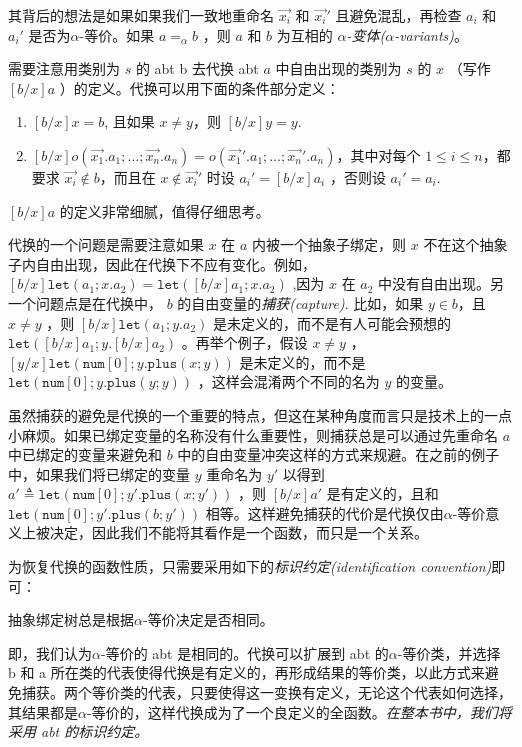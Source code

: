 其背后的想法是如果如果我们一致地重命名 \(\vec{x_i}\) 和 \(\vec{x_i}'\)
且避免混乱，再检查 \(a_i\) 和 \(a_i'\) 是否为$\alpha$-等价。如果
\(a=_\alpha b\) ，则 \(a\) 和 \(b\) 为互相的 \emph{$\alpha$-变体($\alpha$-variants)}。

需要注意用类别为 \(s\) 的 abt b 去代换 abt \(a\) 中自由出现的类别为
\(s\) 的 \(x\) （写作 \([b/x]a\)
）的定义。代换可以用下面的条件部分定义：

\begin{enumerate}
\def\labelenumi{\arabic{enumi}.}
\item
  \([b/x]x=b\), 且如果 \(x\neq y\)，则 \([b/x]y=y\).
\item
  \([b/x]o(\vec{x_1}.a_1;\dots;\vec{x_n}.a_n)=o(\vec{x_1}'.a_1;\dots;\vec{x_n}'.a_n)\)，其中对每个
  \(1\leq i\leq n\)，都要求 \(\vec{x_i}\notin b\)，而且在
  \(x\notin \vec{x_i}'\) 时设 \(a_i'=[b/x]a_i\) ，否则设 \(a_i'=a_i\).
\end{enumerate}

\([b/x]a\) 的定义非常细腻，值得仔细思考。

代换的一个问题是需要注意如果 \(x\) 在 \(a\) 内被一个抽象子绑定，则 \(x\)
不在这个抽象子内自由出现，因此在代换下不应有变化。例如，
\([b/x]\texttt{let}(a_1;x.a_2)=\texttt{let}([b/x]a_1;x.a_2)\) ,因为
\(x\) 在 \(a_2\) 中没有自由出现。另一个问题点是在代换中， \(b\)
的自由变量的\emph{捕获(capture)}. 比如，如果 \(y\in b\)，且 \(x\neq y\)
，则 \([b/x]\texttt{let}(a_1;y.a_2)\) 是未定义的，而不是有人可能会预想的
\(\texttt{let}([b/x]a_1;y.[b/x]a_2)\) 。再举个例子，假设 \(x\neq y\) ，
\([y/x]\texttt{let}(\texttt{num}[0];y.\texttt{plus}(x;y))\)
是未定义的，而不是
\(\texttt{let}(\texttt{num}[0];y.\texttt{plus}(y;y))\)
，这样会混淆两个不同的名为 \(y\) 的变量。

虽然捕获的避免是代换的一个重要的特点，但这在某种角度而言只是技术上的一点小麻烦。如果已绑定变量的名称没有什么重要性，则捕获总是可以通过先重命名
\(a\) 中已绑定的变量来避免和 \(b\)
中的自由变量冲突这样的方式来规避。在之前的例子中，如果我们将已绑定的变量 \(y\) 重命名为
\(y'\) 以得到
\(a' \triangleq \texttt{let}(\texttt{num}[0];y'.\texttt{plus}(x;y'))\)
，则 \([b/x]a'\) 是有定义的，且和
\(\texttt{let}(\texttt{num}[0];y'.\texttt{plus}(b;y'))\)
相等。这样避免捕获的代价是代换仅由$\alpha$-等价意义上被决定，因此我们不能将其看作是一个函数，而只是一个关系。

为恢复代换的函数性质，只需要采用如下的\emph{标识约定(identification
convention)}即可：

  抽象绑定树总是根据$\alpha$-等价决定是否相同。

即，我们认为$\alpha$-等价的 abt 是相同的。代换可以扩展到 abt 的$\alpha$-等价类，并选择
b 和 a
所在类的代表使得代换是有定义的，再形成结果的等价类，以此方式来避免捕获。两个等价类的代表，只要使得这一变换有定义，无论这个代表如何选择，其结果都是$\alpha$-等价的，这样代换成为了一个良定义的全函数。\emph{在整本书中，我们将采用
abt 的标识约定。}


